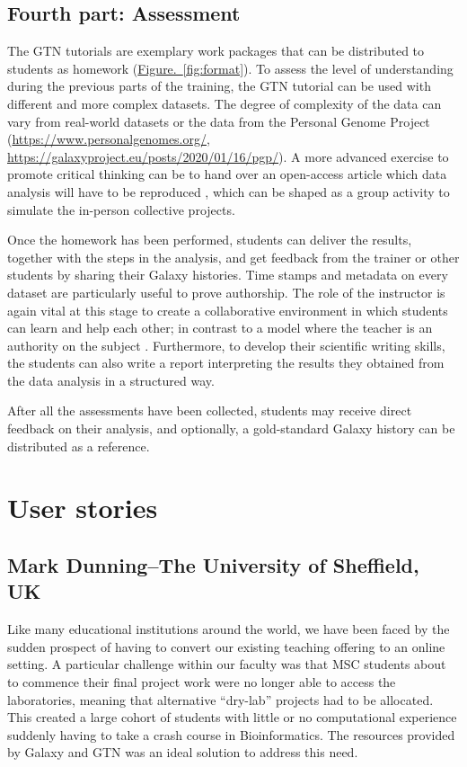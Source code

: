 \subsection*{Fourth part: Assessment}

The GTN tutorials are exemplary work packages that can be distributed to students as homework (\hyperref[fig:format]{Figure.~\ref{fig:format}}). To assess the level of understanding during the previous parts of the training, the GTN tutorial can be used with different and more complex datasets. The degree of complexity of the data can vary from real-world datasets or the data from the Personal Genome Project (\url{https://www.personalgenomes.org/}, \url{https://galaxyproject.eu/posts/2020/01/16/pgp/}). A more advanced exercise to promote critical thinking can be to hand over an open-access article which data analysis will have to be reproduced \cite{chakraborty2017learner}, which can be shaped as a group activity to simulate the in-person collective projects.

Once the homework has been performed, students can deliver the results, together with the steps in the analysis, and get feedback from the trainer or other students by sharing their Galaxy histories. Time stamps and metadata on every dataset are particularly useful to prove authorship. The role of the instructor is again vital at this stage to create a collaborative environment in which students can learn and help each other; in contrast to a model where the teacher is an authority on the subject \cite{mezirow1997transformative}. Furthermore, to develop their scientific writing skills, the students can also write a report interpreting the results they obtained from the data analysis in a structured way.

After all the assessments have been collected, students may receive direct feedback on their analysis, and optionally, a gold-standard Galaxy history can be distributed as a reference.

\section*{User stories}


\subsection*{Mark Dunning–The University of Sheffield, UK}


Like many educational institutions around the world, we have been faced by the sudden prospect of having to convert our existing teaching offering to an online setting. A particular challenge within our faculty was that MSC students about to commence their final project work were no longer able to access the laboratories, meaning that alternative “dry-lab” projects had to be allocated. This created a large cohort of students with little or no computational experience suddenly having to take a crash course in Bioinformatics. The resources provided by Galaxy and GTN was an ideal solution to address this need.

